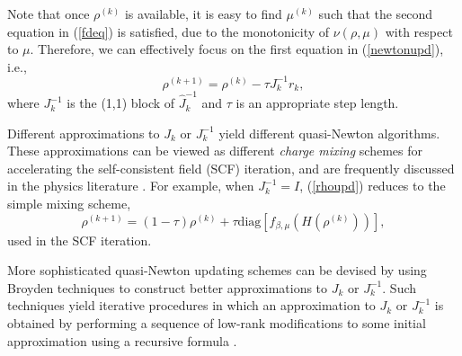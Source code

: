 \documentclass[11pt]{book}
\newcommand{\rhok}{\rho^{(k)}}
\newcommand{\muk}{\mu^{(k)}}
\begin{document}
Note that once $\rhok$ is available, it is easy to find 
$\muk$ such that the second equation in (\ref{fdeq}) is 
satisfied, due to the monotonicity of $\nu(\rho,\mu)$ with respect to $\mu$.
Therefore, we can effectively focus on the first equation in
(\ref{newtonupd}), i.e.,
\begin{equation}
\rho^{(k+1)} = \rho^{(k)} - \tau J_k^{-1} r_k,
\label{rhoupd}
\end{equation}
where $J_k^{-1}$ is the (1,1) block of $\hat{J}_k^{-1}$ and
$\tau$ is an appropriate step length.

Different approximations to $J_k$ or $J_k^{-1}$ yield
different quasi-Newton algorithms. These approximations can be viewed as different
{\em charge mixing} schemes for accelerating the self-consistent 
field (SCF) iteration, and are frequently discussed in the physics 
literature \cite{eyert,kress:cms}.  For example, 
when $J_k^{-1} = I$, (\ref{rhoupd}) reduces to the simple mixing scheme,
\[
\rho^{(k+1)}=(1-\tau)\rho^{(k)} + \tau \mbox{diag}[f_{\beta,\mu}(H(\rho^{(k)}))],
\]
used in the SCF iteration.  

More sophisticated quasi-Newton updating schemes can be devised by using 
Broyden techniques \cite{broyden} to construct better approximations to 
$J_k$ or $J_k^{-1}$. Such techniques yield 
iterative procedures in which an approximation to $J_k$ or $J_k^{-1}$ is 
obtained by performing a sequence of low-rank modifications to some initial 
approximation using a recursive formula \cite{fangsaad,luke}. 
\end{document}
